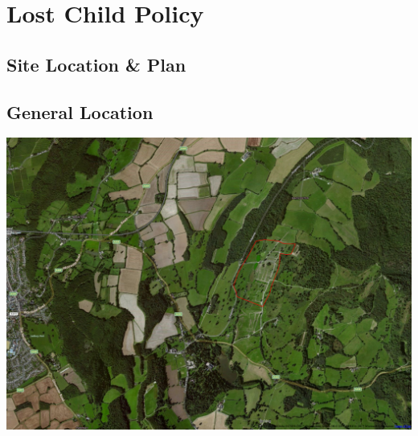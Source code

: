 \section{Lost Child Policy}
\label{lost-child-policy}

\begin{landscape}
\thispagestyle{empty}
\section{Site Location \& Plan}
\label{site-plan}
\subsection{General Location}
\includegraphics[width=23cm]{./supplementary/wide-map.png}
\end{landscape}

\addtocounter{subsection}{1}


